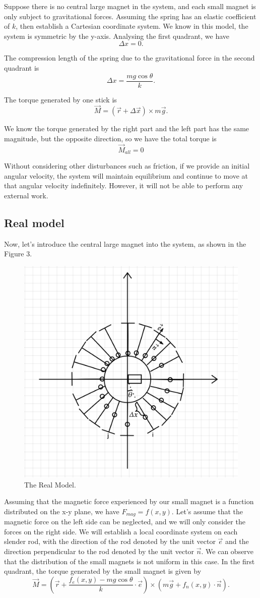\documentclass[12pt]{article}
\begin{document}
Suppose there is no central large magnet in the system, and each small magnet is only subject to gravitational forces. Assuming the spring has an elastic coefficient of $k$, then establish a Cartesian coordinate system. We know in this model, the system is symmetric by the y-axis. Analysing the first quadrant, we have
$$
\Delta x = 0.
$$

The compression length of the spring due to the gravitational force in the second quadrant is
$$
\Delta x = \frac{mg \cos{\theta}}{k}.
$$

The torque generated by one stick is
$$
\vec{M} = (\vec{r}+\Delta \vec{x}) \times m\vec{g}.
$$

We know the torque generated by the right part and the left part has the same magnitude, but the opposite direction, so we have the total torque is 
$$
\vec{M}_{all} = 0
$$

Without considering other disturbances such as friction, if we provide an initial angular velocity, the system will maintain equilibrium and continue to move at that angular velocity indefinitely. However, it will not be able to perform any external work.

\subsection{Real model}
Now, let's introduce the central large magnet into the system, as shown in the Figure 3.
\begin{figure}[h]
    \centering
    \includegraphics[width=0.5\linewidth]{6.png}
    \caption{The Real Model.}
\end{figure}

Assuming that the magnetic force experienced by our small magnet is a function distributed on the x-y plane, we have $F_{mag} = f(x, y)$. Let's assume that the magnetic force on the left side can be neglected, and we will only consider the forces on the right side. We will establish a local coordinate system on each slender rod, with the direction of the rod denoted by the unit vector $\vec{e}$ and the direction perpendicular to the rod denoted by the unit vector $\vec{n}$. We can observe that the distribution of the small magnets is not uniform in this case. In the first quadrant, the torque generated by the small magnet is given by
$$
\vec{M} = ( \vec{r}+ \frac{f_e(x,y) - mg \cos{\theta}}{k}\cdot\vec{e})\times (m\vec{g} + f_n(x,y)\cdot\vec{n}).
$$
\end{document}
